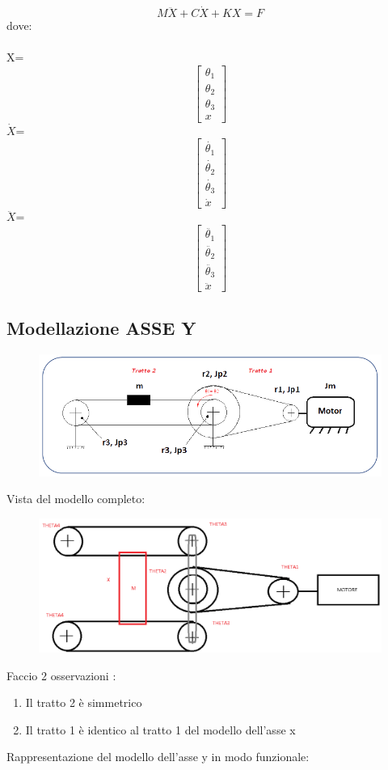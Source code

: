 \documentclass{article}
\begin{document}
$$ M\ddot{X} + C\dot{X} + KX = F $$
dove:
\\
\\
X= 
$$
\begin{bmatrix}
\theta_1 \\
\theta_2\\
\theta_3\\
x 
\end{bmatrix}
$$
$\dot{X}$= 
$$
\begin{bmatrix}
\dot{\theta_1} \\
\dot{\theta_2}\\
\dot{\theta_3}\\
\dot{x} 
\end{bmatrix}
$$
$\ddot{X}$= 
$$
\begin{bmatrix}
\ddot{\theta_1} \\
\ddot{\theta_2}\\
\ddot{\theta_3}\\
\ddot{x} 
\end{bmatrix}
$$
\subsection{Modellazione ASSE Y} 

\begin{figure}[H]
\centering
\includegraphics[width=.6\textwidth]{./assey/assey.png}
\end{figure}
Vista del modello completo:
\begin{figure}[H]
\centering
\includegraphics[width=.7\textwidth]{./assey/assey_p.png}
\end{figure}
Faccio 2 osservazioni :
\begin{enumerate}
    \item  Il tratto 2 è simmetrico
    \item Il tratto 1 è identico al tratto 1 del modello dell'asse x
\end{enumerate}
Rappresentazione del modello dell'asse y in modo funzionale:
\end{document}
